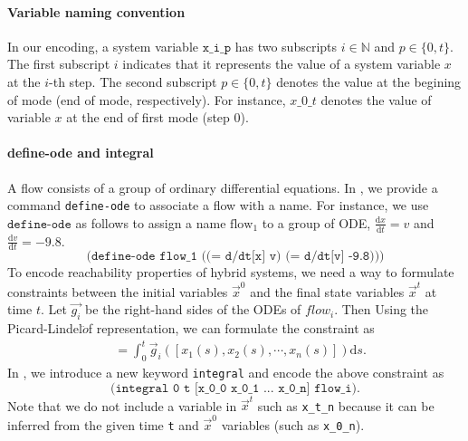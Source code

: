 \paragraph{Variable naming convention}
In our encoding, a system variable $\texttt{x\_i\_p}$ has two
subscripts $i \in \mathbb{N}$ and $p \in \{0, t\}$. The first
subscript $i$ indicates that it represents the value of a system
variable $x$ at the $i$-th step. The second subscript $p \in \{0, t\}$
denotes the value at the begining of mode (end of mode,
respectively). For instance, $x\_0\_t$ denotes the value of variable
$x$ at the end of first mode (step 0).

\paragraph{define-ode and integral}
A flow consists of a group of ordinary differential equations. In
\drh{}, we provide a command \texttt{define-ode} to associate a flow
with a name. For instance, we use $\texttt{define-ode}$ as follows to
assign a name $\mathrm{flow_1}$ to a group of ODE,
$\frac{\mathrm{d}x}{\mathrm{d}t} = v$ and
$\frac{\mathrm{d}v}{\mathrm{d}t} = -9.8$.
\[
\texttt{(define-ode flow\_1 ((= d/dt[x] v) (= d/dt[v] -9.8)))}
\]
To encode reachability properties of hybrid systems, we need a way to
formulate constraints between the initial variables $\vec{x}^0$ and the
final state variables $\vec{x}^t$ at time $t$. Let $\vec{g_i}$ be the
right-hand sides of the ODEs of $flow_i$. Then Using the
Picard-Lindel$\ddot{o}$f representation, we can formulate the
constraint as
\begin{align*}
[x_1^t, x_2^t, \dots, x_n^t] &= \int_0^t \vec{g}_i([x_1(s), x_2(s), \cdots,
x_n(s)]) \mathrm{d}s.
\end{align*}
In \drh{}, we introduce a new keyword \texttt{integral} and encode the
above constraint as
\[
\texttt{(integral 0 t [x\_0\_0 x\_0\_1 ... x\_0\_n] flow\_i)}.
\]
Note that we do not include a variable in $\vec{x}^t$ such as
\texttt{x\_t\_n} because it can be inferred from the given time
\texttt{t} and $\vec{x}^0$ variables (such as \texttt{x\_0\_n}).

